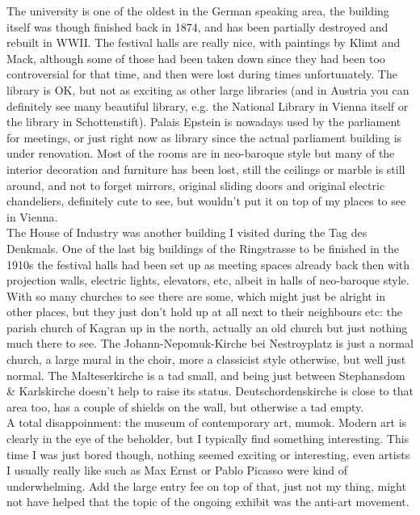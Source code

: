 The university is one of the oldest in the German speaking area, the building itself was though finished back in 1874, and has been partially destroyed and rebuilt in WWII. The festival halls are really nice, with paintings by Klimt and Mack, although some of those had been taken down since they had been too controversial for that time, and then were lost during times unfortunately. The library is OK, but not as exciting as other large libraries (and in Austria you can definitely see many beautiful library, e.g. the National Library in Vienna itself or the library in Schottenstift). Palais Epstein is nowadays used by the parliament for meetings, or just right now as library since the actual parliament building is under renovation. Most of the rooms are in neo-baroque style but many of the interior decoration and furniture has been lost, still the ceilings or marble is still around, and not to forget mirrors, original sliding doors and original electric chandeliers, definitely cute to see, but wouldn't put it on top of my places to see in Vienna.\\
The House of Industry was another building I visited during the Tag des Denkmals. One of the last big buildings of the Ringstrasse to be finished in the 1910s the festival halls had been set up as meeting spaces already back then with projection walls, electric lights, elevators, etc, albeit in halls of neo-baroque style.\\

With so many churches to see there are some, which might just be alright in other places, but they just don't hold up at all next to their neighbours etc: the parish church of Kagran up in the north, actually an old church but just nothing much there to see. The Johann-Nepomuk-Kirche bei Nestroyplatz is just a normal church, a large mural in the choir, more a classicist style otherwise, but well just normal. The Malteserkirche is a tad small, and being just between Stephansdom \& Karlskirche doesn't help to raise its status. Deutschordenskirche is close to that area too, has a couple of shields on the wall, but otherwise a tad empty.\\

A total disappoinment: the museum of contemporary art, mumok. Modern art is clearly in the eye of the beholder, but I typically find something interesting. This time I was just bored though, nothing seemed exciting or interesting, even artists I usually really like such as Max Ernst or Pablo Picasso were kind of underwhelming. Add the large entry fee on top of that, just not my thing, might not have helped that the topic of the ongoing exhibit was the anti-art movement.\\

